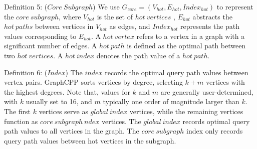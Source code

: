 \documentclass[lettersize,journal]{IEEEtran} %
\begin{document}
Definition 5: ($Core~Subgraph$) We use $G_{core}=(V_{hot},E_{hot},Index_{hot})$ to represent the $core~subgraph$, where $V_{hot}$ is the set of $hot~vertices$ , $E_{hot}$ abstracts the $hot~paths$ between vertices in $V_{hot}$ as edges, and $Index_{hot}$ represents the path values corresponding to $E_{hot}$. A $hot~vertex$ refers to a vertex in a graph with a significant number of edges. A $hot~path$ is defined as the optimal path between two $hot~vertices$. A $hot~index$ denotes the path value of a $hot~path$.

Definition 6: ($Index$) The $index$ records the optimal query path values between vertex pairs. GraphCPP sorts vertices by degree, selecting $k+m$ vertices with the highest degrees. Note that, values for $k$ and $m$ are generally user-determined, with $k$ usually set to 16, and $m$ typically one order of magnitude larger than $k$. The first $k$ vertices serve as $global~index$ vertices, while the remaining vertices function as $core~subgraph~ndex$ vertices. The $global~index$ records optimal query path values to all vertices in the graph. The $core~subgraph$ index only records query path values between hot vertices in the subgraph.
\end{document}
